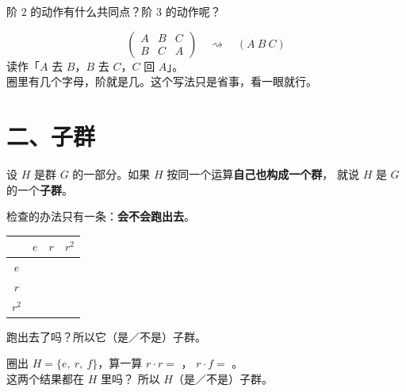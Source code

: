 \begin{sikao}
  阶 \(2\) 的动作有什么共同点？阶 \(3\) 的动作呢？
\end{sikao}

\begin{example}[顺便看一眼循环记法]
  \[
    \begin{pmatrix}A&B&C\\B&C&A\end{pmatrix}
    \quad\rightsquigarrow\quad
    (A\ B\ C)
  \]
  读作「\(A\) 去 \(B\)，\(B\) 去 \(C\)，\(C\) 回 \(A\)」。\\
  圈里有几个字母，阶就是几。这个写法只是省事，看一眼就行。
\end{example}

\section*{二、子群}

\begin{definition}[子群]
  设 \(H\) 是群 \(G\) 的一部分。如果 \(H\) 按同一个运算\textbf{自己也构成一个群}，
  就说 \(H\) 是 \(G\) 的一个\textbf{子群}。
\end{definition}

\noindent 检查的办法只有一条：\textbf{会不会跑出去}。

\begin{dongshou}[填表检查 \(\{e,r,r^2\}\)]
  \begin{center}
  \begin{tabular}{@{}c|ccc@{}}
    \toprule
    & \(e\) & \(r\) & \(r^2\) \\
    \midrule
    \rule{0pt}{3ex}\(e\) & & & \\
    \rule{0pt}{3ex}\(r\) & & & \\
    \rule{0pt}{3ex}\(r^2\) & & & \\
    \bottomrule
  \end{tabular}
  \end{center}
  跑出去了吗？\underline{\hspace{3em}}\quad 所以它\underline{\hspace{2em}}（是／不是）子群。
\end{dongshou}

\begin{dongshou}[再试一个]
  圈出 \(H=\{e,\ r,\ f\}\)，算一算 \(r\cdot r=\) \underline{\hspace{1.6em}}，
  \(r\cdot f=\) \underline{\hspace{1.6em}}。\\
  这两个结果都在 \(H\) 里吗？\underline{\hspace{3em}}
  \quad 所以 \(H\)\underline{\hspace{2em}}（是／不是）子群。
\end{dongshou}

